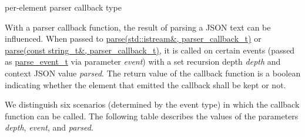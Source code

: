 per-\/element parser callback type 

With a parser callback function, the result of parsing a J\-S\-O\-N text can be influenced. When passed to \hyperlink{classnlohmann_1_1basic__json_a13c4d2ab4e7ee2f92be785a7b12948ff}{parse(std\-::istream\&, parser\-\_\-callback\-\_\-t)} or \hyperlink{classnlohmann_1_1basic__json_a35303ad045a06c2a79dc28ac29652e86}{parse(const string\-\_\-t\&, parser\-\_\-callback\-\_\-t)}, it is called on certain events (passed as \hyperlink{classnlohmann_1_1basic__json_aea1c863b719b4ca5b77188c171bbfafe}{parse\-\_\-event\-\_\-t} via parameter {\itshape event}) with a set recursion depth {\itshape depth} and context J\-S\-O\-N value {\itshape parsed}. The return value of the callback function is a boolean indicating whether the element that emitted the callback shall be kept or not.

We distinguish six scenarios (determined by the event type) in which the callback function can be called. The following table describes the values of the parameters {\itshape depth}, {\itshape event}, and {\itshape parsed}.

